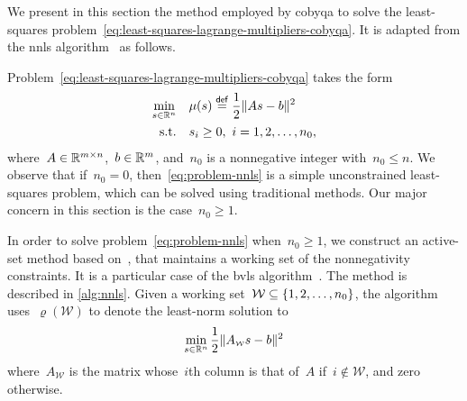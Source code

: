 We present in this section the method employed by \gls{cobyqa} to solve the least-squares problem~\cref{eq:least-squares-lagrange-multipliers-cobyqa}.
It is adapted from the \gls{nnls} algorithm~\cite[Alg.~23.10]{Lawson_Hanson_1987} as follows.

Problem~\cref{eq:least-squares-lagrange-multipliers-cobyqa} takes the form
\begin{subequations}
    \label{eq:problem-nnls}
    \begin{align}
        \min_{\sstep \in \R^n}  & \quad \mu(\sstep) \eqdef \frac{1}{2} \norm{A \sstep - b}^2\\
        \text{s.t.}             & \quad \sstep_i \ge 0, ~ i = 1, 2, \dots, n_0,
    \end{align}
\end{subequations}
where~$A \in \mathbb{R}^{m \times n}$,~$b \in \mathbb{R}^m$, and~$n_0$ is a nonnegative integer with~$n_0 \le n$.
We observe that if~$n_0 = 0$, then~\cref{eq:problem-nnls} is a simple unconstrained least-squares problem, which can be solved using traditional methods.
Our major concern in this section is the case~$n_0 \ge 1$.

In order to solve problem~\cref{eq:problem-nnls} when~$n_0 \ge 1$, we construct an active-set method based on~\cite[Alg.~23.10]{Lawson_Hanson_1987}, that maintains a working set of the nonnegativity constraints.
It is a particular case of the \gls{bvls} algorithm~\cite{Stark_Parker_1995}.
The method is described in \cref{alg:nnls}.
Given a working set~$\mathcal{W} \subseteq \{1, 2, \dots, n_0\}$, the algorithm uses~$\varrho(\mathcal{W})$ to denote the least-norm solution to
\begin{equation*}
    \min_{\sstep \in \R^n} \frac{1}{2} \norm{A_{\scriptscriptstyle \mathcal{W}} \sstep - b}^2
\end{equation*}
where~$A_{\scriptscriptstyle \mathcal{W}}$ is the matrix whose~$i$th column is that of~$A$ if~$i \notin \mathcal{W}$, and zero otherwise.

